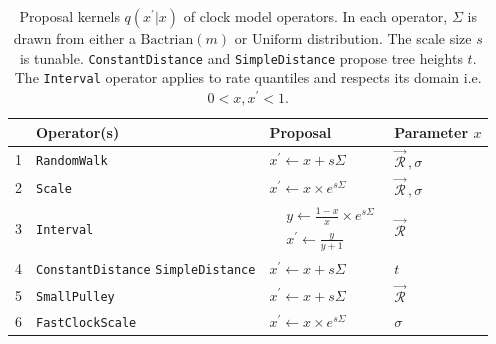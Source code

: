 \documentclass[10pt,letterpaper]{article}
\begin{document}
\begin{table}[h!]
\centering
\begin{tabular}{|l| p{3cm} l l|} 
 \hline
 & Operator(s) & Proposal & Parameter $x$   \\
  \hline
 1 & \texttt{RandomWalk}  & $x^\prime \leftarrow x + s\Sigma$ & $\vec{\mathcal{R}}^{\,}, \sigma$  \\
  \hline
 2 & \texttt{Scale} & $x^\prime \leftarrow x \times e^{s\Sigma}$ & $\vec{\mathcal{R}}^{\,}, \sigma$   \\
  \hline
 3 & \texttt{Interval} & $\begin{array} {rl} &y \leftarrow \frac{1 - x}{x} \times e^{s\Sigma} \\ &x^\prime \leftarrow \frac{y}{y + 1}  \end{array}$ & $\vec{\mathcal{R}}^{\,}$  \\
  \hline
 4 & \texttt{ConstantDistance} \texttt{SimpleDistance} & $x^\prime \leftarrow x + s\Sigma$ & $t$ \\
 \hline
 5 & \texttt{SmallPulley} & $x^\prime \leftarrow x + s\Sigma$ & $\vec{\mathcal{R}}^{\,}$  \\
 \hline
6 & \texttt{FastClockScale}  & $x^\prime \leftarrow x \times e^{s\Sigma}$ & $\sigma$   \\
 \hline
\end{tabular}
\caption{Proposal kernels $q(x^\prime|x)$ of clock model operators.
 In each operator, $\Sigma$ is drawn from either a $\text{Bactrian}(m)$ or $\text{Uniform}$ distribution. 
 The scale size $s$ is tunable.
 \texttt{ConstantDistance} and \texttt{SimpleDistance} propose tree heights $t$.
  The \texttt{Interval} operator applies to rate quantiles and respects its domain i.e. $0 < x, x^\prime < 1$. }
\label{table:bactriankernels}
\end{table}











\clearpage
\end{document}

